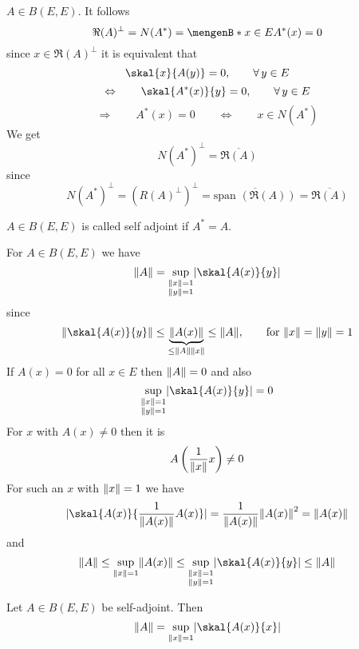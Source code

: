 \begin{beispiel}
	$A \in B(E,E)$. It follows
	\[
		\Re(A)^{\perp} = N(A^*) = \set[x \in E]{A^*(x) = 0}
	\]
	since $x \in \Re(A)^{\perp}$ it is equivalent that
	\[
		\skal{x}{A(y)} = 0, \qquad \forall\, y \in E
	\] 
	\[
		\Leftrightarrow \qquad \skal{A^*(x)}{y} = 0, \qquad \forall\, y \in E
	\]
	\[
		\Rightarrow \qquad A^*(x) = 0 \qquad \Leftrightarrow \qquad x \in N(A^*)
	\]
	We get
	\[
		N(A^*)^{\perp} = \overline{\Re(A)}
	\]
	since
	\[
		N(A^*)^{\perp} = \left( R(A)^{\perp} \right)^{\perp} = \overline{\text{span }(\Re(A))} = \overline{\Re(A)}
	\]
\end{beispiel}
\begin{bemerkung}
	$A \in B(E,E)$ is called self adjoint if $A^* = A$.
\end{bemerkung}
For $A \in B(E,E)$ we have
\[
	\norm{A} =\sup\limits_{\substack{\norm{x} = 1  \\ \norm{y}=1}} \abs{\skal{A(x)}{y}}
\]
since
\[
	\norm{\skal{A(x)}{y}} \leq \underset{\leq \norm{A}\norm{x}}{\underbrace{\norm{A(x)}}} \leq \norm{A}, \qquad \text{for }\norm{x}=\norm{y}=1
\]
If $A(x) = 0$ for all $x \in E$ then $\norm{A}=0$ and also
\[
	\sup\limits_{\substack{\norm{x} = 1  \\ \norm{y}=1}} \abs{\skal{A(x)}{y}} = 0
\]
For $x$ with $A(x) \neq 0$ then it is
\[
	A \left( \frac{1}{\norm{x}}x \right) \neq 0
\]
For such an $x$ with $\norm{x}=1$ we have
\[
	\abs{\skal{A(x)}{\frac{1}{\norm{A(x)}}A(x)}} = \frac{1}{\norm{A(x)}} \norm{A(x)}^2 = \norm{A(x)}
\]
and
\[
	\norm{A} \leq \sup_{\norm{x}=1} \norm{A(x)} \leq \sup\limits_{\substack{\norm{x} = 1  \\ \norm{y}=1}} \abs{\skal{A(x)}{y}} \leq \norm{A}
\]
\begin{proposition}
	Let $A \in B(E,E)$ be self-adjoint. Then
	\[
		\norm{A} = \sup_{\norm{x}=1} \abs{\skal{A(x)}{x}} 
	\]
\end{proposition}
